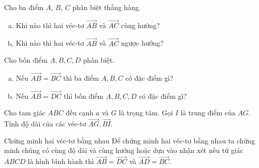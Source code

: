\begin{bt}%
	Cho ba điểm $A$, $B$, $C$ phân biệt thẳng hàng.
	\begin{enumerate}[a)]
		\item Khi nào thì hai véc-tơ $\vec{AB}$ và $\vec{AC}$ cùng hướng?
		\item Khi nào thì hai véc-tơ $\vec{AB}$ và $\vec{AC}$ ngược hướng?
	\end{enumerate}
\end{bt}

\begin{bt}%
	Cho bốn điểm $A, B, C, D$ phân biệt.
	\begin{enumerate}[a)]
		\item Nếu $\vec{AB}=\vec{BC}$ thì ba điểm $A, B, C$ có đặc điểm gì?
		\item Nếu $\vec{AB}=\vec{DC}$ thì bốn điểm $A, B, C, D$ có đặc điểm gì?
	\end{enumerate}
\end{bt}

\begin{bt}%
	Cho tam giác $ABC$ đều cạnh $a$ và $G$ là trọng tâm. Gọi $I$ là trung điểm của $AG$. Tính độ dài của các véc-tơ $\vec{AG}, \vec{BI}$.
\end{bt}

\begin{dang}{Chứng minh hai véc-tơ bằng nhau}
	Để chứng minh hai véc-tơ bằng nhau ta chứng minh chúng có cùng độ dài và cùng hướng hoặc dựa vào nhận xét nếu tứ giác $ABCD$ là hình bình hành thì $\vec{AB}=\vec{DC}$ và $\vec{AD}=\vec{BC}$.
\end{dang}

